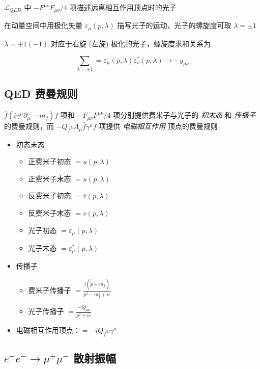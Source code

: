 \documentclass[oneside,a4paper,openany,11pt]{ctexbook}
\begin{document}
$\mathcal{L}_{QED}$ 中 $-F^{\mu\nu} F_{\mu\nu}/4$ 项描述远离相互作用顶点时的光子

在动量空间中用极化矢量 $\varepsilon_\mu(p, \lambda)$ 描写光子的运动，光子的螺旋度可取 $\lambda = \pm 1$

$\lambda = +1 (-1)$ 对应于右旋 (左旋) 极化的光子，螺旋度求和关系为

\begin{equation}
    \sum_{\lambda=\pm 1} = \varepsilon_\mu(p, \lambda) \varepsilon^*_\nu(p, \lambda) \to -g_{\mu\nu}
\end{equation}

\subsection{QED 费曼规则}

$\overline{f} (i \gamma^\mu \partial_\mu - m_f) f$ 项和 $-F_{\mu\nu} F^{\mu\nu}/4$ 项分别提供费米子与光子的 \emph{初末态} 和 \emph{传播子} 的费曼规则，而 $-Q_f e A_\mu \overline{f} \gamma^\mu f$ 项提供 \emph{电磁相互作用} 顶点的费曼规则

\begin{itemize}
    \item 初态末态
        \begin{itemize}
            \item 正费米子初态 $=u(p, \lambda)$
            \item 正费米子末态 $=\overline{u}(p, \lambda)$
            \item 反费米子初态 $=\overline{v}(p, \lambda)$
            \item 反费米子末态 $=v(p, \lambda)$
            \item 光子初态 $=\varepsilon_\mu(p, \lambda)$
            \item 光子末态 $=\varepsilon^*_\mu(p, \lambda)$
        \end{itemize}
    \item 传播子
        \begin{itemize}
            \item 费米子传播子 $=\frac{i(\not{p} + m_f)}{p^2 - m_f^2 + i\varepsilon}$
            \item 光子传播子 $=\frac{-i g_{\mu\nu}}{p^2 + i\varepsilon}$
        \end{itemize}
    \item 电磁相互作用顶点：$=-i Q_f e \gamma^\mu$
\end{itemize}

\subsection{$e^+ e^- \to \mu^+ \mu^-$ 散射振幅}
\end{document}
